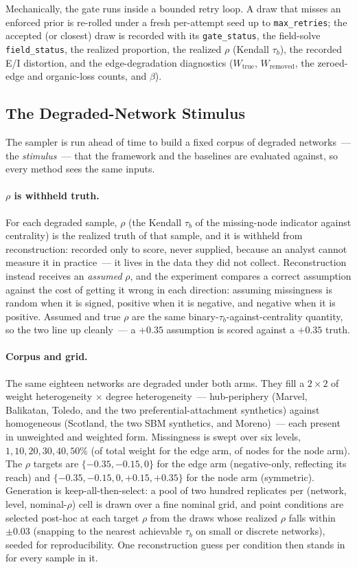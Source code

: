\documentclass[11pt]{article}
\begin{document}
Mechanically, the gate runs inside a bounded retry loop. A draw that misses an enforced prior is re-rolled under a fresh per-attempt seed up to \texttt{max\_retries}; the accepted (or closest) draw is recorded with its \texttt{gate\_status}, the field-solve \texttt{field\_status}, the realized proportion, the realized $\rho$ (Kendall $\tau_b$), the recorded E/I distortion, and the edge-degradation diagnostics ($W_{\text{true}}$, $W_{\text{removed}}$, the zeroed-edge and organic-loss counts, and $\beta$).

\subsection{The Degraded-Network Stimulus}

The sampler is run ahead of time to build a fixed corpus of degraded networks~--- the \emph{stimulus}~--- that the framework and the baselines are evaluated against, so every method sees the same inputs.

\paragraph{$\rho$ is withheld truth.} For each degraded sample, $\rho$ (the Kendall $\tau_b$ of the missing-node indicator against centrality) is the realized truth of that sample, and it is withheld from reconstruction: recorded only to score, never supplied, because an analyst cannot measure it in practice~--- it lives in the data they did not collect. Reconstruction instead receives an \emph{assumed} $\rho$, and the experiment compares a correct assumption against the cost of getting it wrong in each direction: assuming missingness is random when it is signed, positive when it is negative, and negative when it is positive. Assumed and true $\rho$ are the same binary-$\tau_b$-against-centrality quantity, so the two line up cleanly~--- a $+0.35$ assumption is scored against a $+0.35$ truth.

\paragraph{Corpus and grid.} The same eighteen networks are degraded under both arms. They fill a $2 \times 2$ of weight heterogeneity $\times$ degree heterogeneity~--- hub-periphery (Marvel, Balikatan, Toledo, and the two preferential-attachment synthetics) against homogeneous (Scotland, the two SBM synthetics, and Moreno)~--- each present in unweighted and weighted form. Missingness is swept over six levels, $1, 10, 20, 30, 40, 50\%$ (of total weight for the edge arm, of nodes for the node arm). The $\rho$ targets are $\{-0.35, -0.15, 0\}$ for the edge arm (negative-only, reflecting its reach) and $\{-0.35, -0.15, 0, +0.15, +0.35\}$ for the node arm (symmetric). Generation is keep-all-then-select: a pool of two hundred replicates per (network, level, nominal-$\rho$) cell is drawn over a fine nominal grid, and point conditions are selected post-hoc at each target $\rho$ from the draws whose realized $\rho$ falls within $\pm 0.03$ (snapping to the nearest achievable $\tau_b$ on small or discrete networks), seeded for reproducibility. One reconstruction guess per condition then stands in for every sample in it.
\end{document}
